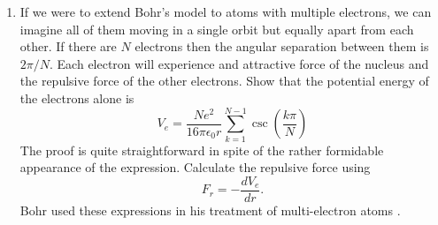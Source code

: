 \begin{enumerate}
\item If we were to extend Bohr's model to atoms with multiple electrons, we
can imagine all of them moving in a single orbit but equally apart from each
other. If there are $N$ electrons then the angular separation between them is
$2\pi/N$. Each electron will experience and attractive force of the nucleus and
the repulsive force of the other electrons. Show that the potential energy of 
the electrons alone is
\begin{equation}\label{c3s3e21}
V_e = \frac{Ne^2}{16\pi\epsilon_0 r}
      \sum_{k=1}^{N-1}\csc\left(\frac{k\pi}{N}\right)
\end{equation}
The proof is quite straightforward in spite of the rather formidable appearance
of the expression. Calculate the repulsive force using
\begin{equation}\label{c3s3e22}
F_r = -\frac{dV_e}{dr}.
\end{equation}
Bohr used these expressions in his treatment of multi-electron atoms 
\cite{bohr1913constitution}.
\end{enumerate}
